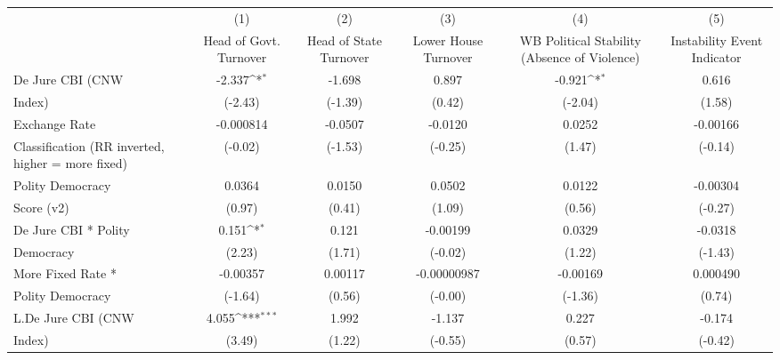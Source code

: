 {
\def\sym#1{\ifmmode^{#1}\else\(^{#1}\)\fi}
\begin{tabular}{l*{5}{c}}
\hline\hline
                    &\multicolumn{1}{c}{(1)}&\multicolumn{1}{c}{(2)}&\multicolumn{1}{c}{(3)}&\multicolumn{1}{c}{(4)}&\multicolumn{1}{c}{(5)}\\
                    &\multicolumn{1}{c}{Head of Govt. Turnover}&\multicolumn{1}{c}{Head of State Turnover}&\multicolumn{1}{c}{Lower House Turnover}&\multicolumn{1}{c}{WB Political Stability (Absence of Violence)}&\multicolumn{1}{c}{Instability Event Indicator}\\
\hline
De Jure CBI (CNW    &      -2.337\sym{*}  &      -1.698         &       0.897         &      -0.921\sym{*}  &       0.616         \\
Index)              &     (-2.43)         &     (-1.39)         &      (0.42)         &     (-2.04)         &      (1.58)         \\
[1em]
Exchange Rate       &   -0.000814         &     -0.0507         &     -0.0120         &      0.0252         &    -0.00166         \\
Classification (RR inverted, higher = more fixed)&     (-0.02)         &     (-1.53)         &     (-0.25)         &      (1.47)         &     (-0.14)         \\
[1em]
Polity Democracy    &      0.0364         &      0.0150         &      0.0502         &      0.0122         &    -0.00304         \\
Score (v2)          &      (0.97)         &      (0.41)         &      (1.09)         &      (0.56)         &     (-0.27)         \\
[1em]
De Jure CBI * Polity&       0.151\sym{*}  &       0.121         &    -0.00199         &      0.0329         &     -0.0318         \\
Democracy           &      (2.23)         &      (1.71)         &     (-0.02)         &      (1.22)         &     (-1.43)         \\
[1em]
More Fixed Rate *   &    -0.00357         &     0.00117         & -0.00000987         &    -0.00169         &    0.000490         \\
Polity Democracy    &     (-1.64)         &      (0.56)         &     (-0.00)         &     (-1.36)         &      (0.74)         \\
[1em]
L.De Jure CBI (CNW  &       4.055\sym{***}&       1.992         &      -1.137         &       0.227         &      -0.174         \\
Index)              &      (3.49)         &      (1.22)         &     (-0.55)         &      (0.57)         &     (-0.42)         \\

\end{tabular}}
